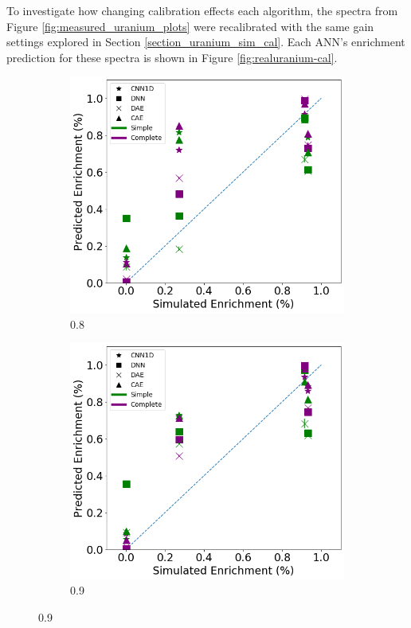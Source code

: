 To investigate how changing calibration effects each algorithm, the spectra from Figure \ref{fig:measured_uranium_plots} were recalibrated with the same gain settings explored in Section \ref{section_uranium_sim_cal}. Each ANN's enrichment prediction for these spectra is shown in Figure \ref{fig:realuranium-cal}.

\begin{figure}[H]
	\centering
	\begin{subfigure}[b]{0.49\textwidth}
		\centering
		\includegraphics[width=\textwidth]{images/measured_uranium_08.png}
		\caption{0.8}
		\label{fig:measured_uranium_08}
	\end{subfigure}
	\hfill
	\begin{subfigure}[b]{0.49\textwidth}
		\centering
		\includegraphics[width=\textwidth]{images/measured_uranium_09.png}
		\caption{0.9}
		\label{fig:measured_uranium_09}
	\end{subfigure}
	

\end{figure}
